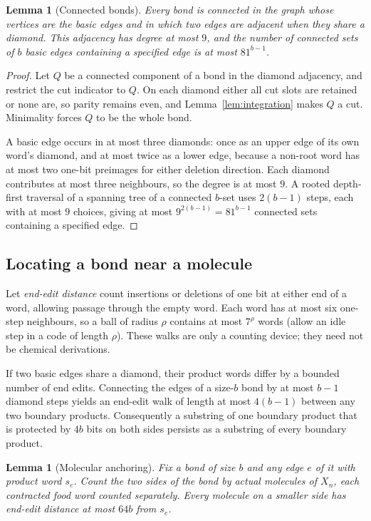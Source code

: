 \documentclass[11pt,reqno]{amsart}
\theoremstyle{plain}
\newtheorem{lemma}[theorem]{Lemma}
\theoremstyle{definition}
\theoremstyle{remark}
\numberwithin{equation}{section}
\begin{document}
\begin{lemma}[Connected bonds]\label{lem:bond-connected}
Every bond is connected in the graph whose vertices are the basic edges and in which two edges are adjacent when they share a diamond. This adjacency has degree at most $9$, and the number of connected sets of $b$ basic edges containing a specified edge is at most $81^{b-1}$.
\end{lemma}

\begin{proof}
Let $Q$ be a connected component of a bond in the diamond adjacency, and restrict the cut indicator to $Q$. On each diamond either all cut slots are retained or none are, so parity remains even, and Lemma~\ref{lem:integration} makes $Q$ a cut. Minimality forces $Q$ to be the whole bond.

A basic edge occurs in at most three diamonds: once as an upper edge of its own word's diamond, and at most twice as a lower edge, because a non-root word has at most two one-bit preimages for either deletion direction. Each diamond contributes at most three neighbours, so the degree is at most $9$. A rooted depth-first traversal of a spanning tree of a connected $b$-set uses $2(b-1)$ steps, each with at most $9$ choices, giving at most $9^{2(b-1)}=81^{b-1}$ connected sets containing a specified edge.
\end{proof}

\subsection{Locating a bond near a molecule}
Let \emph{end-edit distance} count insertions or deletions of one bit at either end of a word, allowing passage through the empty word. Each word has at most six one-step neighbours, so a ball of radius $\rho$ contains at most $7^{\rho}$ words (allow an idle step in a code of length $\rho$). These walks are only a counting device; they need not be chemical derivations.

If two basic edges share a diamond, their product words differ by a bounded number of end edits. Connecting the edges of a size-$b$ bond by at most $b-1$ diamond steps yields an end-edit walk of length at most $4(b-1)$ between any two boundary products. Consequently a substring of one boundary product that is protected by $4b$ bits on both sides persists as a substring of every boundary product.

\begin{lemma}[Molecular anchoring]\label{lem:anchor}
Fix a bond of size $b$ and any edge $e$ of it with product word $s_e$. Count the two sides of the bond by actual molecules of $X_n$, each contracted food word counted separately. Every molecule on a smaller side has end-edit distance at most $64b$ from $s_e$.
\end{lemma}
\end{document}
